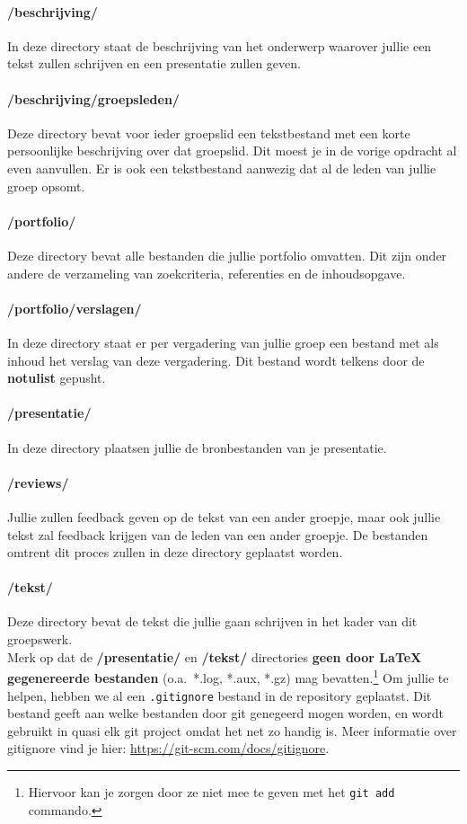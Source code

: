 \documentclass[a4paper]{article}
\begin{document}
\paragraph{/beschrijving/}
In deze directory staat de beschrijving van het onderwerp waarover jullie een tekst zullen schrijven en een presentatie zullen geven.
\paragraph{/beschrijving/groepsleden/}
Deze directory bevat voor ieder groepslid een tekstbestand met een korte persoonlijke beschrijving over dat groepslid.
Dit moest je in de vorige opdracht al even aanvullen.
Er is ook een tekstbestand aanwezig dat al de leden van jullie groep opsomt.
\paragraph{/portfolio/}
Deze directory bevat alle bestanden die jullie portfolio omvatten.
Dit zijn onder andere de verzameling van zoekcriteria, referenties en de inhoudsopgave.
\paragraph{/portfolio/verslagen/}
In deze directory staat er per vergadering van jullie groep een bestand met als inhoud het verslag van deze vergadering.
Dit bestand wordt telkens door de \textbf{notulist} gepusht.
\paragraph{/presentatie/}
In deze directory plaatsen jullie de bronbestanden van je presentatie.
\paragraph{/reviews/}
Jullie zullen feedback geven op de tekst van een ander groepje, maar ook jullie tekst zal feedback krijgen van de leden van een ander groepje.
De bestanden omtrent dit proces zullen in deze directory geplaatst worden.
\paragraph{/tekst/}
Deze directory bevat de tekst die jullie gaan schrijven in het kader van dit groepswerk.\\

Merk op dat de \textbf{/presentatie/} en \textbf{/tekst/} directories \textbf{geen door \LaTeX{} gegenereerde bestanden} (o.a.\ *.log, *.aux, *.gz) mag bevatten.\footnote{Hiervoor kan je zorgen door ze niet mee te geven met het \texttt{git add} commando.}
Om jullie te helpen, hebben we al een \texttt{.gitignore} bestand in de repository geplaatst.
Dit bestand geeft aan welke bestanden door git genegeerd mogen worden, en wordt gebruikt in quasi elk git project omdat het net zo handig is.
Meer informatie over gitignore vind je hier: \url{https://git-scm.com/docs/gitignore}.
\end{document}
